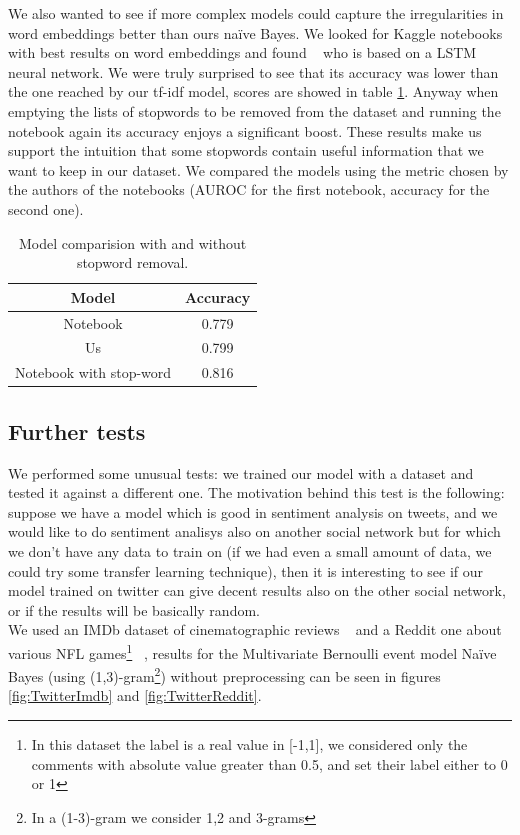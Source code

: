 We also wanted to see if more complex models could capture the irregularities in word embeddings better than ours na\"ive Bayes. 
We looked for Kaggle notebooks with best results on word embeddings and found ~\cite{startups:notebook2} who is based on a LSTM neural network.
We were truly surprised to see that its accuracy was lower than the one reached by our tf-idf model, scores are showed in table \ref{tab:versus_metrics_FT}. 
Anyway when emptying the lists of stopwords to be removed from the dataset and running the notebook again its accuracy enjoys a significant boost. 
These results make us support the intuition that some stopwords contain useful information that we want to keep in our dataset. We compared the models using the metric chosen by the authors of the notebooks (AUROC for the first notebook, accuracy for the second one).

\begin{table}[h!t]
    \centering
    \caption{Model comparision with and without stopword removal.}
    \label{tab:versus_metrics_FT}
    \begin{tabular}{c|c}
        \hline
        Model & Accuracy\\
        \hline 
        Notebook & 0.779 \\ 
        Us & 0.799 \\ 
        Notebook with stop-word & 0.816 \\ 
        \hline
    \end{tabular}
\end{table}

\subsection*{Further tests}
We performed some unusual tests: we trained our model with a dataset and tested it against a different one. The motivation behind this test is the following: suppose we have a model which is good in sentiment analysis on tweets, and we would like to do sentiment analisys also on another social network but for which we don't have any data to train on (if we had even a small amount of data, we could try some transfer learning technique), then it is interesting to see if our model trained on twitter can give decent results also on the other social network, or if the results will be basically random.\\
We used an IMDb dataset of cinematographic reviews ~\cite{data:imdb} and a Reddit one about various NFL games\footnote{In this dataset the label is a real value in [-1,1], we considered only the comments with absolute value greater than 0.5, and set their label either to 0 or 1} ~\cite{data:reddit}, results for the Multivariate Bernoulli event model Na\"ive Bayes (using (1,3)-gram\footnote{In a (1-3)-gram we consider 1,2 and 3-grams}) without preprocessing can be seen in figures \ref{fig:TwitterImdb} and \ref{fig:TwitterReddit}.

